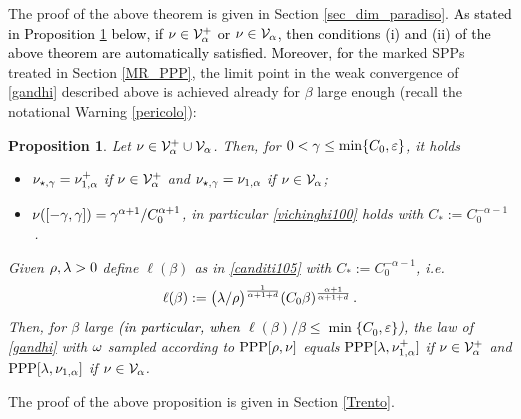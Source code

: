 \documentclass[12pt,a4paper,reqno]{amsart}
\newtheorem{Proposition}[Theorem]{Proposition}
\newcommand{\cV}{\ensuremath{\mathcal V}}
\let\a=\alpha \let\b=\beta   \let\d=\delta  \let\e=\varepsilon
\newcommand{\rosso}{\textcolor{black}} %
\newcommand{\be}{\begin{equation}}
\newcommand{\en}{\end{equation}}
\newcommand{\cv}{\rosso{\cV_\alpha}}
\newcommand{\cvp}{\rosso{\cV^+_\alpha}}
\begin{document}
The proof of the above theorem is given in Section \ref{sec_dim_paradiso}.  \rosso{As stated in Proposition \ref{paradiso_PPP} below, if $\nu \in \cvp$ or $\nu\in\cv$, then conditions (i) and (ii) of the above theorem are automatically satisfied. Moreover, for} the marked SPPs treated in Section \ref{MR_PPP}, the limit point in the weak convergence of \eqref{gandhi} described above is achieved already for $\b$ large enough
(recall the notational Warning \ref{pericolo}):

\begin{Proposition}\label{paradiso_PPP} Let $\nu\in \cvp\cup\cv$.
  Then, for    $0<\g \leq \min\{C_0,\e\} $, it holds 
\begin{itemize}
\item[(i)]    $\nu_{\star, \g} = \nu^+_{1,\a}$ if $\nu \in \cvp$ and   $\nu _{\star, \g}=\nu_{1,\a}$ if $\nu\in \cv$; 
\item[(ii)] $\nu([-\g, \g])= \g^{\a+1}/C_0^{\a+1}$, in particular   \eqref{vichinghi100} holds with $C_*:= C_0 ^{-\a-1}$\,.
\end{itemize}
 Given $\rho, \lambda>0$ define  $\ell(\beta)$ as in \eqref{canditi105}  with  $C_*:= C_0 ^{-\a-1}$, i.e.
\be\label{canditi200}
 \ell(\b):= \bigl(\l /\rho\bigr)^{\frac{1}{\a+1+d}}(C_0 \b) ^{\frac{\a+1}{\a+1+d}}\,.
\en
 Then, for $\beta$ large \rosso{(in particular, when $\ell(\b)/\b\leq \min\{C_0,\e\}$)}, the law of \eqref{gandhi} 
with $\omega$ sampled according to ${\rm PPP}[\rho,  \nu]$
 equals ${\rm PPP}[\l, \nu^+_{1, \a}] $ if $\nu\in \cvp$  and ${\rm PPP}[\l, \nu_{1, \a}] $  if $\nu\in \cv$. \end{Proposition}



The proof of the above proposition  is given in Section \ref{Trento}.
\end{document}
